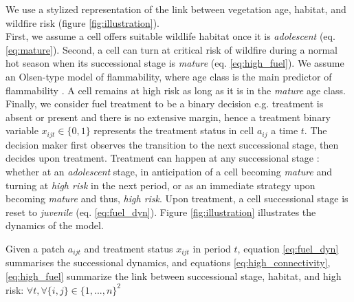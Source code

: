 We use a stylized representation of the link between vegetation age, habitat, and wildfire risk (figure \ref{fig:illustration}). \\
First, we assume a cell offers suitable wildlife habitat once it is \textit{adolescent} (eq. \ref{eq:mature}). Second, a cell can turn at critical risk of wildfire during a normal hot season when its successional stage is \textit{mature} (eq. \ref{eq:high_fuel}). We assume an Olsen-type model of flammability, where age class is the main predictor of flammability \citep{Olson1963,mccarthy_theoretical_2001,mccoll_gausden_pathways_2019}. A cell remains at high risk as long as it is in the \textit{mature} age class. \\
Finally, we consider fuel treatment to be a binary decision e.g. treatment is absent or present and there is no extensive margin, hence a treatment binary variable $x_{ijt}\in\{0,1\}$ represents the treatment status in cell $a_{ij}$ a time $t$. The decision maker first observes the transition to the next successional stage, then decides upon treatment.
Treatment can happen at any successional stage : whether at an \textit{adolescent} stage, in anticipation of a cell becoming \textit{mature} and turning at \textit{high risk} in the next period, or as an immediate strategy upon becoming \textit{mature} and thus, \textit{high risk}.
Upon treatment, a cell successional stage is reset to \textit{juvenile} (eq. \ref{eq:fuel_dyn}). Figure \ref{fig:illustration} illustrates the dynamics of the model.

Given a patch $a_{ijt}$ and treatment status $x_{ijt}$ in period $t$, equation \ref{eq:fuel_dyn} summarises the successional dynamics, and equations \ref{eq:high_connectivity},\ref{eq:high_fuel} summarize the link between successional stage, habitat, and high risk: $\forall t, \forall \{i,j\} \in \{1,..., n\}^2$

